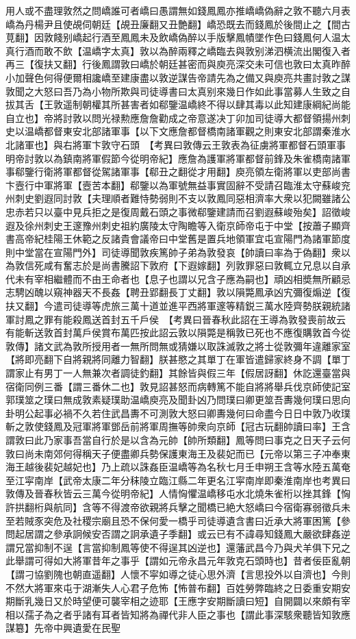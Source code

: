 用人或不盡理敦然之問嶠誰可者嶠曰愚謂無如錢鳳鳳亦推嶠嶠偽辭之敦不聽六月表嶠為丹楊尹且使覘伺朝廷【覘丑廉翻又丑艶翻】嶠恐既去而錢鳳於後間止之【間古莧翻】因敦餞别嶠起行酒至鳳鳳未及飲嶠偽醉以手版擊鳳幘墜作色曰錢鳳何人温太真行酒而敢不飲【温嶠字太真】敦以為醉兩釋之嶠臨去與敦别涕泗横流出閣復入者再三【復扶又翻】行後鳳謂敦曰嶠於朝廷甚密而與庾亮深交未可信也敦曰太真昨醉小加聲色何得便爾相讒嶠至建康盡以敦逆謀告帝請先為之備又與庾亮共畫討敦之謀敦聞之大怒曰吾乃為小物所欺與司徒導書曰太真别來幾日作如此事當募人生致之自拔其舌【王敦遥制朝權其所甚害者如郗鑒温嶠終不得以肆其毒以此知建康綱紀尚能自立也】帝將討敦以問光禄勲應詹詹勸成之帝意遂决丁卯加司徒導大都督領揚州刺史以温嶠都督東安北部諸軍事【以下文應詹都督橋南諸軍觀之則東安北部謂秦淮水北諸軍也】與右將軍卞敦守石頭　【考異曰敦傳云王敦表為征虜將軍都督石頭軍事明帝討敦以為鎮南將軍假節今從明帝紀】應詹為護軍將軍都督前鋒及朱雀橋南諸軍事郗鑒行衛將軍都督從駕諸軍事【郗丑之翻從才用翻】庾亮領左衛將軍以吏部尚書卞壼行中軍將軍【壼苦本翻】郗鑒以為軍號無益事實固辭不受請召臨淮太守蘇峻兖州刺史劉遐同討敦【夫理順者難恃勢弱則不支以敦鳳同惡相濟率大衆以犯闕雖諸公忠赤若只以臺中見兵拒之是復周戴石頭之事微郗鑒建請而召劉遐蘇峻殆矣】詔徵峻遐及徐州刺史王邃豫州刺史祖約廣陵太守陶瞻等入衛京師帝屯于中堂【按蕭子顯齊書高帝紀桂陽王休範之反諸貴會議帝曰中堂舊是置兵地領軍宜屯宣陽門為諸軍節度則中堂當在宣陽門外】司徒導聞敦疾篤帥子弟為敦發哀【帥讀曰率為于偽翻】衆以為敦信死咸有奮志於是尚書騰詔下敦府【下遐嫁翻】列敦罪惡曰敦輒立兄息以自承代未有宰相繼體而不由王命者也【息子也謂以兄含子應為嗣也】頑凶相奬無所顧忌志騁凶醜以窺神器天不長姦【聘丑郢翻長丁丈翻】敦以隕斃鳳承凶宄彌復煽逆【復扶又翻】今遣司徒導等虎旅三萬十道並進平西將軍邃等精鋭三萬水陸齊勢朕親統諸軍討鳳之罪有能殺鳳送首封五千戶侯　【考異曰晉春秋此詔在王導為敦發喪前故云有能斬送敦首封萬戶侯賞布萬匹按此詔云敦以隕斃是稱敦已死也不應復購敦首今從敦傳】諸文武為敦所授用者一無所問無或猜嫌以取誅滅敦之將士從敦彌年違離家室【將即亮翻下自將親將同離力智翻】朕甚愍之其單丁在軍皆遣歸家終身不調【單丁謂家止有男丁一人無兼次者調徒釣翻】其餘皆與假三年【假居訝翻】休訖還臺當與宿衛同例三番【謂三番休二也】敦見詔甚怒而病轉篤不能自將將舉兵伐京師使記室郭璞筮之璞曰無成敦素疑璞助温嶠庾亮及聞卦凶乃問璞曰卿更筮吾夀幾何璞曰思向卦明公起事必禍不久若住武昌夀不可測敦大怒曰卿夀幾何曰命盡今日日中敦乃收璞斬之敦使錢鳳及冠軍將軍鄧岳前將軍周撫等帥衆向京師【冠古玩翻帥讀曰率】王含謂敦曰此乃家事吾當自行於是以含為元帥【帥所類翻】鳳等問曰事克之日天子云何敦曰尚未南郊何得稱天子便盡卿兵勢保護東海王及裴妃而已【元帝以第三子冲奉東海王越後裴妃越妃也】乃上疏以誅姦臣温嶠等為名秋七月壬申朔王含等水陸五萬奄至江寜南岸【武帝太康二年分秣陵立臨江縣二年更名江寜南岸即秦淮南岸也考異曰敦傳及晉春秋皆云三萬今從明帝紀】人情恟懼温嶠移屯水北燒朱雀桁以挫其鋒【恟許拱翻桁與航同】含等不得渡帝欲親將兵擊之聞橋已絶大怒嶠曰今宿衛寡弱徵兵未至若賊豕突危及社稷宗廟且恐不保何愛一橋乎司徒導遺含書曰近承大將軍困篤【參問起居謂之參承詗候安否謂之詗承遺子季翻】或云已有不諱尋知錢鳳大嚴欲肆姦逆謂兄當抑制不逞【言當抑制鳳等使不得逞其凶逆也】還藩武昌今乃與犬羊俱下兄之此舉謂可得如大將軍昔年之事乎【謂如元帝永昌元年敦克石頭時也】昔者佞臣亂朝【謂刁協劉隗也朝直遥翻】人懷不寜如導之徒心思外濟【言思投外以自濟也】今則不然大將軍來屯于湖漸失人心君子危怖【怖普布翻】百姓勞弊臨終之日委重安期安期斷乳幾日又於時望便可襲宰相之迹耶【王應字安期斷讀曰短】自開闢以來頗有宰相以孺子為之者乎諸有耳者皆知將為禪代非人臣之事也【謂此事深駭衆聽皆知敦應謀簒】先帝中興遺愛在民聖